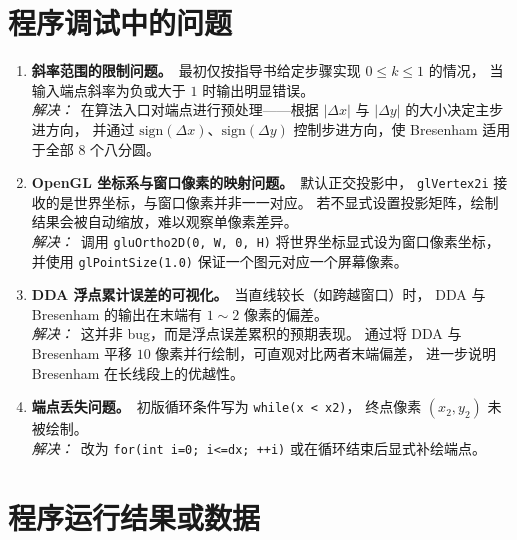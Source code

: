 \documentclass[a4paper,12pt]{ctexart}
\begin{document}
\section{程序调试中的问题}

\begin{enumerate}[leftmargin=2em,itemsep=0.4em]
    \item \textbf{斜率范围的限制问题。}\ 最初仅按指导书给定步骤实现 $0\le k\le 1$ 的情况，
        当输入端点斜率为负或大于 $1$ 时输出明显错误。\\
        \textit{解决：}\ 在算法入口对端点进行预处理——根据 $|\Delta x|$ 与 $|\Delta y|$ 的大小决定主步进方向，
        并通过 $\mathrm{sign}(\Delta x)$、$\mathrm{sign}(\Delta y)$ 控制步进方向，使 Bresenham 适用于全部 8 个八分圆。

    \item \textbf{OpenGL 坐标系与窗口像素的映射问题。}\ 默认正交投影中，
        \texttt{glVertex2i} 接收的是世界坐标，与窗口像素并非一一对应。
        若不显式设置投影矩阵，绘制结果会被自动缩放，难以观察单像素差异。\\
        \textit{解决：}\ 调用 \texttt{gluOrtho2D(0, W, 0, H)} 将世界坐标显式设为窗口像素坐标，
        并使用 \texttt{glPointSize(1.0)} 保证一个图元对应一个屏幕像素。

    \item \textbf{DDA 浮点累计误差的可视化。}\ 当直线较长（如跨越窗口）时，
        DDA 与 Bresenham 的输出在末端有 $1\sim 2$ 像素的偏差。\\
        \textit{解决：}\ 这并非 bug，而是浮点误差累积的预期表现。
        通过将 DDA 与 Bresenham 平移 $10$ 像素并行绘制，可直观对比两者末端偏差，
        进一步说明 Bresenham 在长线段上的优越性。

    \item \textbf{端点丢失问题。}\ 初版循环条件写为 \texttt{while(x < x2)}，
        终点像素 $(x_2,y_2)$ 未被绘制。\\
        \textit{解决：}\ 改为 \texttt{for(int i=0; i<=dx; ++i)} 或在循环结束后显式补绘端点。
\end{enumerate}

\section{程序运行结果或数据}
\end{document}

